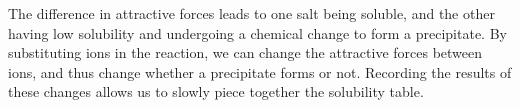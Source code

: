 The difference in attractive forces leads to one salt being soluble, and the other having low solubility and undergoing a chemical change to form a precipitate. By substituting ions in the reaction, we can change the attractive forces between ions, and thus change whether a precipitate forms or not. Recording the results of these changes allows us to slowly piece together the solubility table.